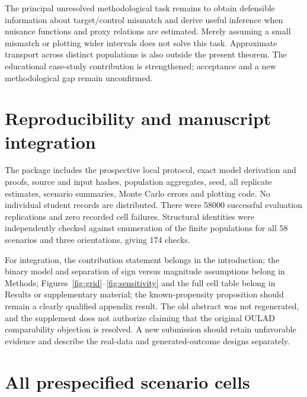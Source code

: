 \documentclass[11pt,a4paper]{article}
\begin{document}
The principal unresolved methodological task remains to obtain defensible information about target/control mismatch and derive useful inference when nuisance functions and proxy relations are estimated. Merely assuming a small mismatch or plotting wider intervals does not solve this task. Approximate transport across distinct populations is also outside the present theorem. The educational case-study contribution is strengthened; acceptance and a new methodological gap remain unconfirmed.

\section{Reproducibility and manuscript integration}

The package includes the prospective local protocol, exact model derivation and proofs, source and input hashes, population aggregates, seed, all replicate estimates, scenario summaries, Monte Carlo errors and plotting code. No individual student records are distributed. There were 58000 successful evaluation replications and zero recorded cell failures. Structural identities were independently checked against enumeration of the finite populations for all 58 scenarios and three orientations, giving 174 checks.

For integration, the contribution statement belongs in the introduction; the binary model and separation of sign versus magnitude assumptions belong in Methods; Figures~\ref{fig:grid}--\ref{fig:sensitivity} and the full cell table belong in Results or supplementary material; the known-propensity proposition should remain a clearly qualified appendix result. The old abstract was not regenerated, and the supplement does not authorize claiming that the original OULAD comparability objection is resolved. A new submission should retain unfavorable evidence and describe the real-data and generated-outcome designs separately.

\clearpage
\appendix
\section{All prespecified scenario cells}
\small
\setlength{\tabcolsep}{3pt}

\normalsize
\end{document}
